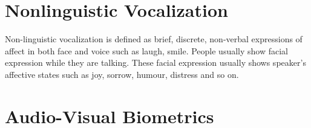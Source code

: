 \section{Nonlinguistic Vocalization}
Non-linguistic vocalization is defined as brief, discrete, non-verbal expressions of affect in both face and voice \cite{petridis2011audiovisual} such as laugh, smile. People usually show facial expression while they are talking. These facial expression usually shows speaker's affective states such as joy, sorrow, humour, distress and so on.
\section{Audio-Visual Biometrics}
